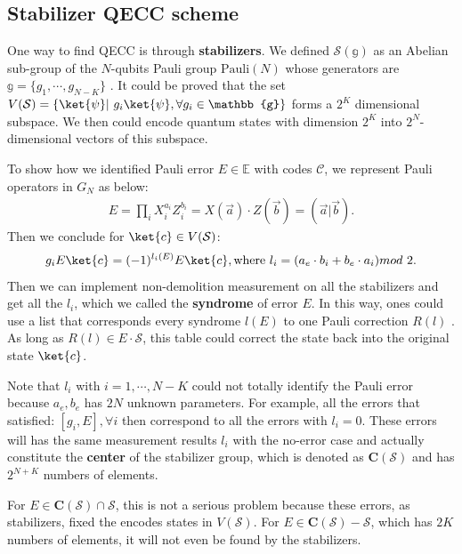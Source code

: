 \documentclass[11pt]{article}
\begin{document}
\subsection{Stabilizer QECC scheme}
One way to find QECC is through \textbf{stabilizers}. 
We defined $\mathcal{S}(\mathbb{g})$ as an Abelian sub-group of the $N$-qubits Pauli group $\text{Pauli}(N)$ whose generators are $ \mathbb{g}= \{g_1,\cdots,g_{N - K}\}$ . 
It could be proved that the set $V(\mathcal{S}) =\{\ket{\psi} |~ g_i \ket{\psi}, \forall g_i \in \mathbb{g}\}$  forms a $2^K$ dimensional subspace. 
We then could encode quantum states with dimension $2^K$ into $2^N$-dimensional vectors of this subspace.  

To show how we identified Pauli error $E \in \mathbb{E}$ with codes $\mathcal{C}$, we represent Pauli operators in $G_N$ as below:
\begin{align}
    E = \prod_i X_i^{a_i} Z_i^{b_i} =X(\Vec{a})\cdot Z(\Vec{b})= (\Vec{a}|\Vec{b}).
\end{align}
Then we conclude for $\ket{c} \in V(\mathcal{S})$:
\begin{align}
    g_i E \ket{c} = (-1)^{l_i(E)} E \ket{c}, \text{where~} l_i = (a_e \cdot b_i + b_e \cdot a_i) mod~ 2.
\end{align}
Then we can implement non-demolition measurement on all the stabilizers and get all the $l_i$, which we called the \textbf{syndrome} of error $E$. 
In this way, ones could use a list that corresponds every syndrome $l(E)$ to one Pauli correction $R(l)$ . As long as $R(l) \in E\cdot \mathcal{S}$, this table could correct the state back into the original state $\ket{c}$. 


Note that $l_i$ with $i = 1,\cdots,N-K$ could not totally identify the Pauli error because $a_e,b_e$ has $2N$ unknown parameters. 
For example, all the errors that satisfied: $[g_i,E], \forall i$ then correspond to all the errors with $l_i = 0$. 
These errors will has the same measurement results $l_i$ with the no-error case and actually constitute the \textbf{center} of the stabilizer group, which is denoted as $\mathbf{C}(\mathcal{S})$ and has $2^{N+K}$ numbers of elements.

For $E \in \mathbf{C}(\mathcal{S}) \cap \mathcal{S}$, this is not a serious problem because these errors, as stabilizers, fixed the encodes states in $V(\mathcal{S})$.
For $E \in \mathbf{C}(\mathcal{S}) - \mathcal{S}$, which has $2K$ numbers of elements, it will not even be found by the stabilizers. 
\end{document}
